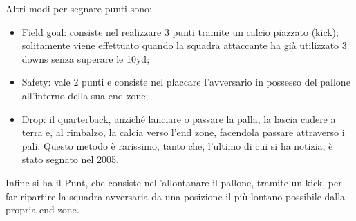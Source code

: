 \documentclass[a4paper, 12pt, oneside]{book}
\begin{document}
	Altri modi per segnare punti sono:
	\begin{itemize}
		\item Field goal: consiste nel realizzare 3 punti tramite un calcio piazzato (kick); solitamente viene effettuato quando la squadra attaccante ha già utilizzato 3 downs senza superare le 10yd;
		\item Safety: vale 2 punti e consiste nel placcare l'avversario in possesso del pallone all'interno della sua end zone;
		\item Drop: il quarterback, anziché lanciare o passare la palla, la lascia cadere a terra e, al rimbalzo, la calcia verso l'end zone, facendola passare attraverso i pali. Questo metodo è rarissimo, tanto che, l'ultimo di cui si ha notizia, è stato segnato nel 2005.
	\end{itemize}
	Infine si ha il Punt, che consiste nell'allontanare il pallone, tramite un kick, per far ripartire la squadra avversaria da una posizione il più lontano possibile dalla propria end zone.
	
\end{document}
